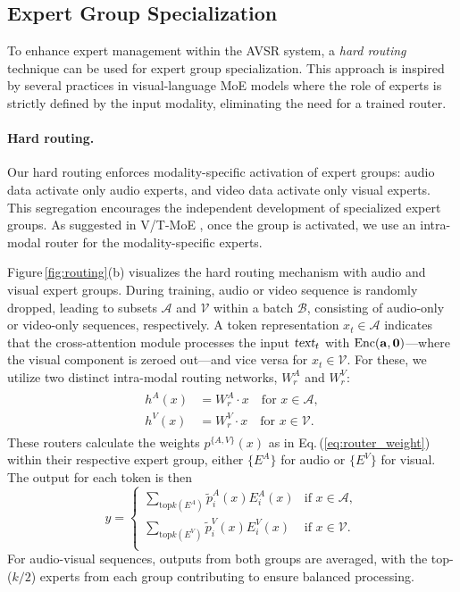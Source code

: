 \subsection{Expert Group Specialization}
\label{subsec:hard_routing}


To enhance expert management within the AVSR system, a \textit{hard routing} technique can be used for expert group specialization. This approach is inspired by several practices in visual-language MoE models \citep{zhu2022uni, li2023pace, shen2023scaling, lee2025moai} where the role of experts is strictly defined by the input modality, eliminating the need for a trained router.

\vspace*{-8pt}
\paragraph{Hard routing.}
Our hard routing enforces modality-specific activation of expert groups: audio data activate only audio experts, and video data activate only visual experts.
This segregation encourages the independent development of specialized expert groups. As suggested in V/T-MoE \citep{shen2023scaling}, once the group is activated, we use an intra-modal router for the modality-specific experts.

Figure\,\ref{fig:routing}(b) visualizes the hard routing mechanism with audio and visual expert groups.
During training, audio or video sequence is randomly dropped, leading to subsets $\mathcal{A}$ and $\mathcal{V}$ within a batch $\mathcal{B}$, consisting of audio-only or video-only sequences, respectively. A token representation $x_t \in \mathcal{A}$ indicates that the cross-attention module processes the input $\textsl{text}_t$ with $\text{Enc}({\mathbf{a}}, {\bm{0}})$---where the visual component is zeroed out---and vice versa for $x_t \in \mathcal{V}$.
For these, we utilize two distinct intra-modal routing networks, $W_r^A$ and $W_r^V$:
\begin{align}
\begin{split}
    h^A(x) &= W_r^A \cdot x \quad \text{for } x \in \mathcal{A}, \\
    h^V(x) &= W_r^V \cdot x \quad \text{for } x \in \mathcal{V}.
\end{split}
\end{align}
These routers calculate the weights $p^{\{A,V\}}(x)$ as in Eq.\,(\ref{eq:router_weight}) within their respective expert group, either $\{E^A\}$ for audio or $\{E^V\}$ for visual. The output for each token is then
\begin{equation}
    y = \begin{cases}
        \sum_{\text{top}k(E^A)} \tilde{p}_i^A(x) E^A_i(x) & \text{if } x \in \mathcal{A}, \\
        \sum_{\text{top}k(E^V)} \tilde{p}_i^V(x) E^V_i(x) & \text{if } x \in \mathcal{V}. \\ 
    \end{cases} 
\end{equation}
For audio-visual sequences, outputs from both groups are averaged, with the top-($k/2$) experts from each group contributing to ensure balanced processing.
